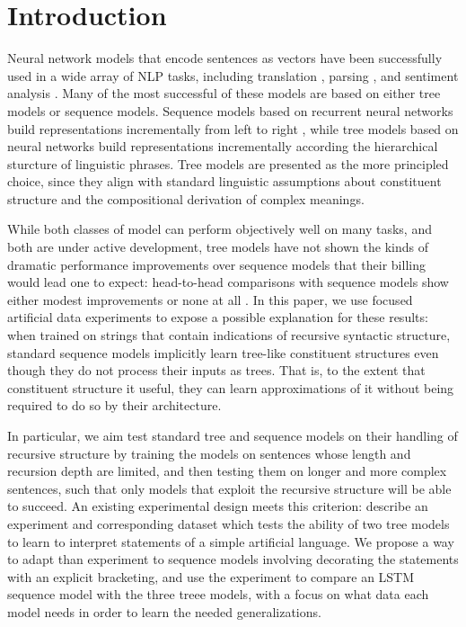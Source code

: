 \section{Introduction}\label{sec:intro}

Neural network models that encode sentences as vectors have been successfully used in a wide array of NLP tasks, including translation \cite{sutskever2014sequence}, parsing \cite{dyer2015transition}, and sentiment analysis \cite{tai2015improved}. Many of the most successful of these models are based on either tree models or sequence models. Sequence models based on recurrent neural networks build representations incrementally from left to right \cite{elman1990finding,sutskever2014sequence}, while tree models based on  neural networks \cite{goller1996learning,socher2011semi} build representations incrementally according the hierarchical sturcture of linguistic phrases. Tree models are presented as the more principled choice, since they align with standard linguistic assumptions about constituent structure and the compositional derivation of complex meanings.

While both classes of model can perform objectively well on many tasks, and both are under active development, tree models have not shown the kinds of dramatic performance improvements over sequence models that their billing would lead one to expect: head-to-head comparisons with sequence models show either modest improvements \cite{tai2015improved} or none at all \cite{li2015tree}. 
In this paper, we use focused artificial data experiments to expose a possible explanation for these results: when trained on strings that contain indications of recursive syntactic structure, standard sequence models implicitly learn tree-like constituent structures even though they do not process their inputs as trees. That is, to the extent that constituent structure it useful, they can learn approximations of it without being required to do so by their architecture.

In particular, we aim test standard tree and sequence models on their handling of recursive structure by training the models on sentences whose length and recursion depth are limited, and then testing them on longer and more complex sentences, such that only models that exploit the recursive structure will be able to succeed. An existing experimental design meets this criterion:  describe an experiment and corresponding dataset which tests the ability of two tree models to learn to interpret statements of a simple artificial language. We propose a way to adapt than experiment to sequence models involving decorating the statements with an explicit bracketing, and use the experiment to compare an LSTM sequence model with the three treee models, with a focus on what data each model needs in order to learn the needed generalizations.

